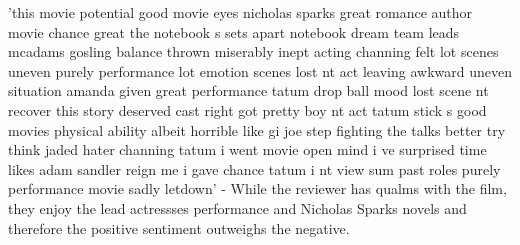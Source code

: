 \documentclass[11pt]{article}
\begin{document}
'this movie potential good movie eyes nicholas sparks great romance
author movie chance great the notebook s sets apart notebook dream team
leads mcadams gosling balance thrown miserably inept acting channing
felt lot scenes uneven purely performance lot emotion scenes lost nt act
leaving awkward uneven situation amanda given great performance tatum
drop ball mood lost scene nt recover this story deserved cast right got
pretty boy nt act tatum stick s good movies physical ability albeit
horrible like gi joe step fighting the talks better try think jaded
hater channing tatum i went movie open mind i ve surprised time likes
adam sandler reign me i gave chance tatum i nt view sum past roles
purely performance movie sadly letdown' - While the reviewer has qualms
with the film, they enjoy the lead actressses performance and Nicholas
Sparks novels and therefore the positive sentiment outweighs the
negative.


    
    
    
    
\end{document}
